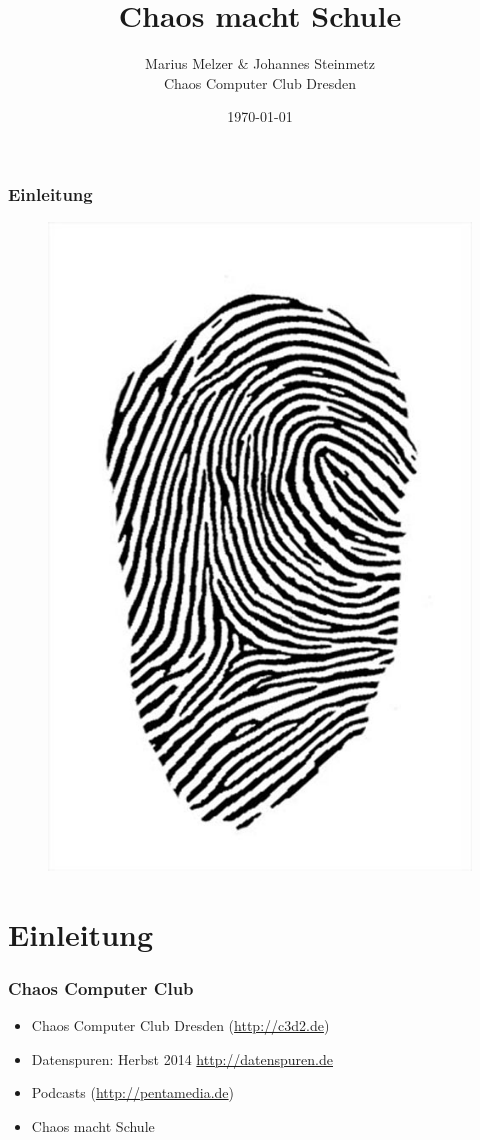 \documentclass[12pt]{beamer}
\title{Chaos macht Schule}
\author{\small Marius Melzer \& Johannes Steinmetz\\\large Chaos Computer Club Dresden}
\date{\today}
\begin{document}
\maketitle


\begin{frame}
  \frametitle{Einleitung}
  \begin{figure}
    \includegraphics[height=0.7\textheight]{img/fingerabdruck.jpg}
  \end{figure}
\end{frame}


\section{Einleitung}
\begin{frame}
    \frametitle{Chaos Computer Club}
    \begin{itemize}
      \item<1-> Chaos Computer Club Dresden (\url{http://c3d2.de})
          \note{}
      \item<2-> Datenspuren: Herbst 2014 \url{http://datenspuren.de}
      \item<3-> Podcasts (\url{http://pentamedia.de})
      \item<4-> Chaos macht Schule
    \end{itemize}
\end{frame}
\end{document}
